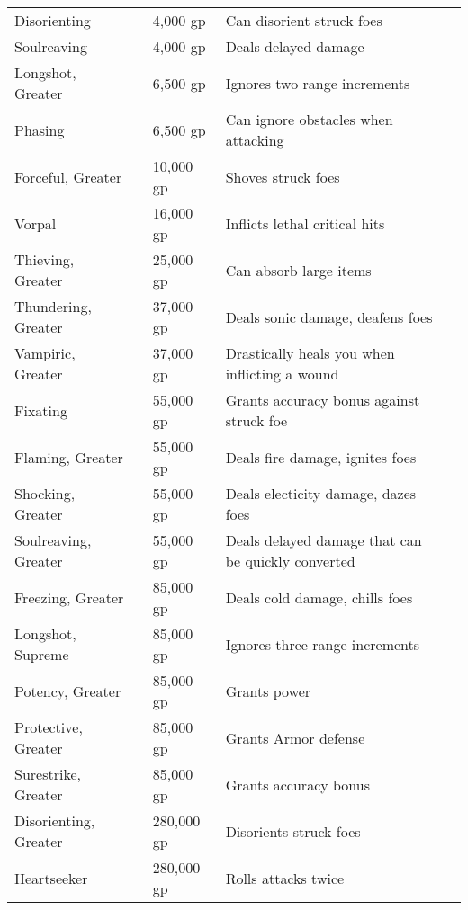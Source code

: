 \begin{longtabuwrapper}
\begin{longtabu}{l l l X l}
Disorienting &  & 4,000 gp & Can disorient struck foes & \pageref{item:Disorienting} \\
Soulreaving &  & 4,000 gp & Deals delayed damage & \pageref{item:Soulreaving} \\
Longshot, Greater &  & 6,500 gp & Ignores two range increments & \pageref{item:Longshot, Greater} \\
Phasing &  & 6,500 gp & Can ignore obstacles when attacking & \pageref{item:Phasing} \\
Forceful, Greater &  & 10,000 gp & Shoves struck foes & \pageref{item:Forceful, Greater} \\
Vorpal &  & 16,000 gp & Inflicts lethal critical hits & \pageref{item:Vorpal} \\
Thieving, Greater &  & 25,000 gp & Can absorb large items & \pageref{item:Thieving, Greater} \\
Thundering, Greater &  & 37,000 gp & Deals sonic damage, deafens foes & \pageref{item:Thundering, Greater} \\
Vampiric, Greater &  & 37,000 gp & Drastically heals you when inflicting a wound & \pageref{item:Vampiric, Greater} \\
Fixating &  & 55,000 gp & Grants accuracy bonus against struck foe & \pageref{item:Fixating} \\
Flaming, Greater &  & 55,000 gp & Deals fire damage, ignites foes & \pageref{item:Flaming, Greater} \\
Shocking, Greater &  & 55,000 gp & Deals electicity damage, dazes foes & \pageref{item:Shocking, Greater} \\
Soulreaving, Greater &  & 55,000 gp & Deals delayed damage that can be quickly converted & \pageref{item:Soulreaving, Greater} \\
Freezing, Greater &  & 85,000 gp & Deals cold damage, chills foes & \pageref{item:Freezing, Greater} \\
Longshot, Supreme &  & 85,000 gp & Ignores three range increments & \pageref{item:Longshot, Supreme} \\
Potency, Greater &  & 85,000 gp & Grants  power & \pageref{item:Potency, Greater} \\
Protective, Greater &  & 85,000 gp & Grants  Armor defense & \pageref{item:Protective, Greater} \\
Surestrike, Greater &  & 85,000 gp & Grants  accuracy bonus & \pageref{item:Surestrike, Greater} \\
Disorienting, Greater &  & 280,000 gp & Disorients struck foes & \pageref{item:Disorienting, Greater} \\
Heartseeker &  & 280,000 gp & Rolls attacks twice & \pageref{item:Heartseeker} \\
\end{longtabu}
\end{longtabuwrapper}
